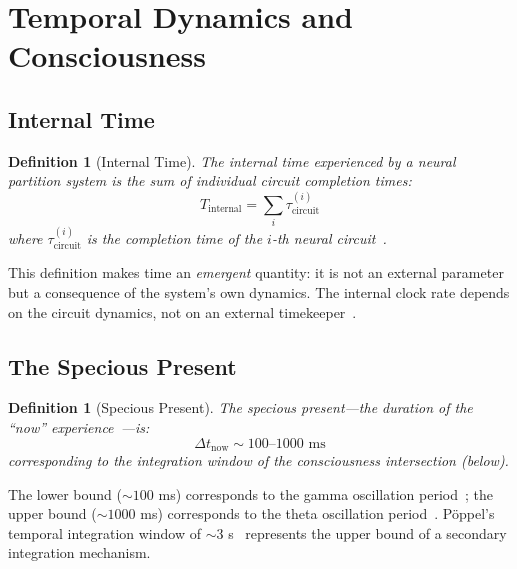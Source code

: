 \documentclass[10pt,twocolumn]{article}
\newtheorem{definition}[theorem]{Definition}
\theoremstyle{remark}
\begin{document}
\section{Temporal Dynamics and Consciousness}
\label{sec:consciousness}

\subsection{Internal Time}

\begin{definition}[Internal Time]
\label{def:internal_time}
The internal time experienced by a neural partition system is the sum of individual circuit completion times:
\begin{equation}
T_{\mathrm{internal}} = \sum_i \tau_{\mathrm{circuit}}^{(i)}
\label{eq:internal_time}
\end{equation}
where $\tau_{\mathrm{circuit}}^{(i)}$ is the completion time of the $i$-th neural circuit~\cite{buzsaki2006rhythms,poppel1997temporal}.
\end{definition}

This definition makes time an \emph{emergent} quantity: it is not an external parameter but a consequence of the system's own dynamics. The internal clock rate depends on the circuit dynamics, not on an external timekeeper~\cite{buhusi2005time}.

\subsection{The Specious Present}

\begin{definition}[Specious Present]
\label{def:specious}
The specious present---the duration of the ``now'' experience~\cite{james1890principles}---is:
\begin{equation}
\Delta t_{\mathrm{now}} \sim 100\text{--}1000 \text{ ms}
\label{eq:specious}
\end{equation}
corresponding to the integration window of the consciousness intersection (below).
\end{definition}

The lower bound ($\sim 100$ ms) corresponds to the gamma oscillation period~\cite{engel2001dynamic}; the upper bound ($\sim 1000$ ms) corresponds to the theta oscillation period~\cite{buzsaki2006rhythms}. P\"{o}ppel's temporal integration window of $\sim 3$ s~\cite{poppel1997temporal} represents the upper bound of a secondary integration mechanism.
\end{document}
